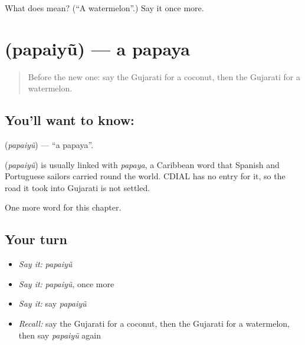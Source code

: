 \begin{tcolorbox}[breakable,colback=teal!4,colframe=teal!35!black,title={Before you move on}]
What does  mean? (\textquotedblleft{}A watermelon\textquotedblright{}.) Say it once more.
\end{tcolorbox}
\section[\texorpdfstring{\gu{પપૈયું} (papaiyũ)}{પપૈયું (papaiyũ)}]{ (papaiyũ) — a papaya}

\label{lesson:GU-C116-papaiyu}



\begin{quote}
Before the new one: say the Gujarati for a coconut, then the Gujarati for a watermelon.
\end{quote}

\subsection*{You'll want to know: }
\textbf{} (\emph{papaiyũ}) — \textquotedblleft{}a papaya\textquotedblright{}.

\begin{cousinweb}
\textbf{} (\emph{papaiyũ}) is usually linked with \emph{papaya}, a Caribbean word that Spanish and Portuguese sailors carried round the world. CDIAL has no entry for it, so the road it took into Gujarati is not settled.
\end{cousinweb}

\begin{grammarlens}[title={What you've built}]
One more word for this chapter.
\end{grammarlens}

\subsection*{Your turn}
\begin{itemize}
\raggedright
  \item \emph{Say it:} \emph{papaiyũ}
  \item \emph{Say it:} \emph{papaiyũ}, once more
  \item \emph{Say it:} say \emph{papaiyũ}
  \item \emph{Recall:} say the Gujarati for a coconut, then the Gujarati for a watermelon, then say \emph{papaiyũ} again
\end{itemize}


